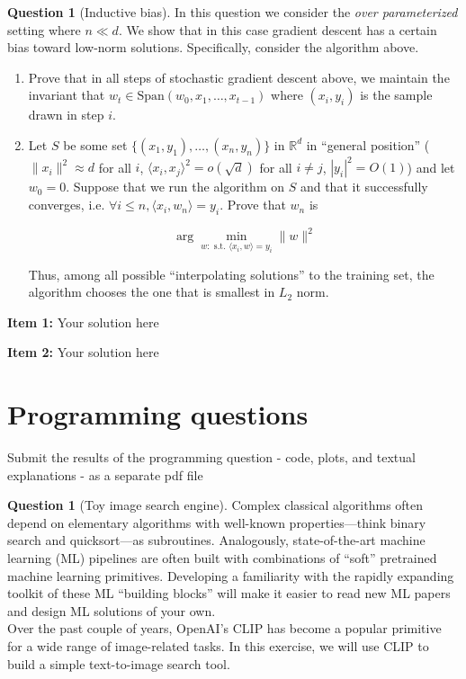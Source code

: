 \documentclass{article}
\theoremstyle{definition}
\newtheorem{question}{Question}
\newtheorem{subquestion}{Question}[question]
\newenvironment{solution}{\color{blue}{\textbf{Solution \arabic{question}.\arabic{subquestion}:}\smallskip\newline}}{}
\begin{document}
\begin{subquestion}[Inductive bias]
In this question we consider the \textit{over parameterized} setting where $n\ll d$. We show that in this case gradient descent has a certain bias toward low-norm solutions. Specifically, consider the algorithm above.

\begin{enumerate}

\item Prove that in all steps of stochastic gradient descent above, we maintain the invariant that $w_t \in \mathrm{Span}(w_0,x_1,\ldots,x_{t-1})$ where $(x_i,y_i)$ is the sample drawn in step $i$. 

\item Let $S$ be some set $\{ (x_1,y_1),\ldots, (x_n,y_n) \}$ in $\mathbb{R}^d$ in ``general position'' ( $\| x_i \|^2\approx d$ for all $i$, $\langle x_i,x_j \rangle^2 = o(\sqrt{d})$ for all $i \neq j$, $|y_i|^2 = O(1)$) and let $w_0 = 0$. Suppose that we run the algorithm on $S$ and that it successfully converges, i.e. $\forall i \leq n, \langle x_i, w_n \rangle = y_i$. Prove that $w_n$ is 

$$\arg\min_{w : \text{ s.t. } \langle x_i, w \rangle = y_i} \| w \|^2$$

Thus, among all possible ``interpolating solutions'' to the training set, the algorithm chooses the one that is smallest in $L_2$ norm.

\end{enumerate}
\end{subquestion}


\begin{solution}
\textbf{Item 1:} Your solution here 


\textbf{Item 2:}  Your solution here
\end{solution}

\section*{Programming questions}

{\color{blue} Submit the results of the programming question - code, plots, and textual explanations - as a separate pdf file }

\begin{question}[Toy image search engine]
Complex classical algorithms often depend on elementary algorithms with well-known properties---think binary search and quicksort---as subroutines. Analogously, state-of-the-art machine learning (ML) pipelines are often built with combinations of ``soft'' pretrained machine learning primitives. Developing a familiarity with the rapidly expanding toolkit of these ML ``building blocks'' will make it easier to read new ML papers and design ML solutions of your own. \\

Over the past couple of years, OpenAI's CLIP has become a popular primitive for a wide range of image-related tasks. In this exercise, we will use CLIP to build a simple text-to-image search tool. \\
    \end{question}
\end{document}
